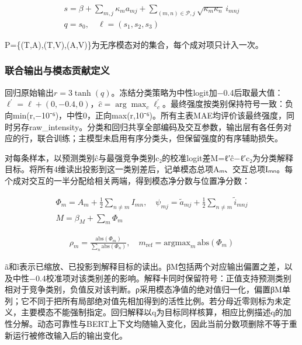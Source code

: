 \begin{equation}
\begin{gathered}s=\beta+\sum_{m,j}\kappa_m a_{mj}+\sum_{(m,n)\in\mathcal P,j}\sqrt{\kappa_m\kappa_n}\,i_{mnj} \\ q=s_0,\quad \ell=(s_1,s_2,s_3)\end{gathered}\label{q3-eq5}
\end{equation}

P=\{(T,A),(T,V),(A,V)\}为无序模态对的集合，每个成对项只计入一次。

\hypertarget{q3-ux8054ux5408ux8f93ux51faux4e0eux6a21ux6001ux8d21ux732eux5b9aux4e49}{%
\subsubsection{联合输出与模态贡献定义}\label{q3-ux8054ux5408ux8f93ux51faux4e0eux6a21ux6001ux8d21ux732eux5b9aux4e49}}

回归原始输出\(r=3\tanh(q)\)。冻结分类策略为中性logit加−0.4后取最大值：\(\ell^{\prime}=\ell+(0,-0.4,0)\)，\(\hat c=\arg\max_c\ell^{\prime}_c\)。最终强度按类别保持符号一致：负向min(r,−10⁻⁶)，中性0，正向max(r,10⁻⁶)。所有主表MAE均评价该最终强度，同时另存raw\_intensity。分类和回归共享全部编码及交互参数，输出层有各任务对应的行，联合训练；主模型未启用有序分类头，但保留强度的有序辅助损失。

对每条样本，以预测类别ĉ与最强竞争类别c₂的校准logit差M=ℓ′ĉ−ℓ′c₂为分类解释目标。将所有4维读出投影到这一类别差后，记单模态总项Aₘ、交互总项Iₘₙ。每个成对交互的一半分配给相关两端，得到模态净分数与位置净分数：

\begin{equation}
\begin{gathered}\Phi_m=A_m+\frac12\sum_{n\ne m}I_{mn},\quad\psi_{mj}=\tilde{a}_{mj}+\frac12\sum_{n\ne m}\tilde{i}_{mnj} \\ M=\beta_M+\sum_m\Phi_m\end{gathered}\label{q3-eq6}
\end{equation}

\begin{equation}
\begin{gathered}\rho_m=\frac{\mathrm{abs}(\Phi_m)}{\sum_n\mathrm{abs}(\Phi_n)},\quad m_{\mathrm{ref}}=\mathrm{argmax}_m\,\mathrm{abs}(\Phi_m)\end{gathered}\label{q3-eq7}
\end{equation}

ã和ĩ表示已缩放、已投影到解释目标的读出。βM包括两个对应输出偏置之差，以及中性−0.4校准项对该类别差的影响。解释卡同时保留符号：正值支持预测类别相对于竞争类别，负值反对该判断。ρ采用模态净值的绝对值归一化，偏置βM单列；它不同于把所有局部绝对值先相加得到的活性比例。若分母近零则标为未定义，主要模态不能强制指定。回归解释以q为目标同样核算，相应比例描述q的加性分解。动态可靠性与BERT上下文均随输入变化，因此当前分数项删除不等于重新运行被修改输入后的输出变化。

